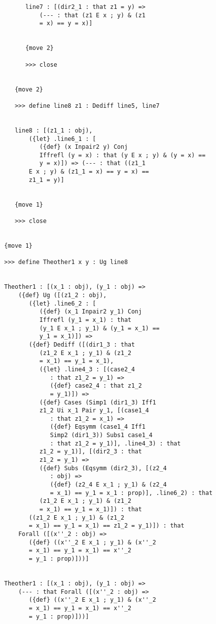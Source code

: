 \documentclass[12pt]{article}
\begin{document}
\begin{verbatim}
         line7 : [(dir2_1 : that z1 = y) => 
             (--- : that (z1 E x ; y) & (z1 
             = x) == y = x)]


         {move 2}

         >>> close


      {move 2}

      >>> define line8 z1 : Dediff line5, line7


      line8 : [(z1_1 : obj), 
          ({let} .line6_1 : [
             ({def} (x Inpair2 y) Conj 
             Iffrefl (y = x) : that (y E x ; y) & (y = x) == 
             y = x)]) => (--- : that ((z1_1 
          E x ; y) & (z1_1 = x) == y = x) == 
          z1_1 = y)]


      {move 1}

      >>> close


   {move 1}

   >>> define Theother1 x y : Ug line8


   Theother1 : [(x_1 : obj), (y_1 : obj) => 
       ({def} Ug ([(z1_2 : obj), 
          ({let} .line6_2 : [
             ({def} (x_1 Inpair2 y_1) Conj 
             Iffrefl (y_1 = x_1) : that 
             (y_1 E x_1 ; y_1) & (y_1 = x_1) == 
             y_1 = x_1)]) => 
          ({def} Dediff ([(dir1_3 : that 
             (z1_2 E x_1 ; y_1) & (z1_2 
             = x_1) == y_1 = x_1), 
             ({let} .line4_3 : [(case2_4 
                : that z1_2 = y_1) => 
                ({def} case2_4 : that z1_2 
                = y_1)]) => 
             ({def} Cases (Simp1 (dir1_3) Iff1 
             z1_2 Ui x_1 Pair y_1, [(case1_4 
                : that z1_2 = x_1) => 
                ({def} Eqsymm (case1_4 Iff1 
                Simp2 (dir1_3)) Subs1 case1_4 
                : that z1_2 = y_1)], .line4_3) : that 
             z1_2 = y_1)], [(dir2_3 : that 
             z1_2 = y_1) => 
             ({def} Subs (Eqsymm (dir2_3), [(z2_4 
                : obj) => 
                ({def} (z2_4 E x_1 ; y_1) & (z2_4 
                = x_1) == y_1 = x_1 : prop)], .line6_2) : that 
             (z1_2 E x_1 ; y_1) & (z1_2 
             = x_1) == y_1 = x_1)]) : that 
          ((z1_2 E x_1 ; y_1) & (z1_2 
          = x_1) == y_1 = x_1) == z1_2 = y_1)]) : that 
       Forall ([(x''_2 : obj) => 
          ({def} ((x''_2 E x_1 ; y_1) & (x''_2 
          = x_1) == y_1 = x_1) == x''_2 
          = y_1 : prop)]))]


   Theother1 : [(x_1 : obj), (y_1 : obj) => 
       (--- : that Forall ([(x''_2 : obj) => 
          ({def} ((x''_2 E x_1 ; y_1) & (x''_2 
          = x_1) == y_1 = x_1) == x''_2 
          = y_1 : prop)]))]



\end{verbatim}
\end{document}

